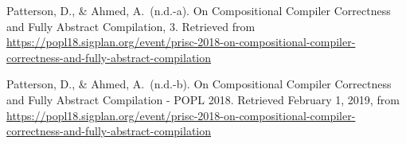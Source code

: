 \documentclass[12pt,twoside]{article}
\begin{document}
{\begin{thebibliography}{222}
Patterson, D., \& Ahmed, A.~(n.d.-a). On Compositional Compiler Correctness and Fully Abstract Compilation, 3. Retrieved from \href{https://popl18.sigplan.org/event/prisc-2018-on-compositional-compiler-correctness-and-fully-abstract-compilation}{{\ttfamily https://\hspace{0pt}popl18.\hspace{0pt}sigplan.\hspace{0pt}org/\hspace{0pt}event/\hspace{0pt}prisc-\hspace{0pt}2018-\hspace{0pt}on-\hspace{0pt}compositional-\hspace{0pt}compiler-\hspace{0pt}correctness-\hspace{0pt}and-\hspace{0pt}fully-\hspace{0pt}abstract-\hspace{0pt}compilation}}\label{patterson_compositional_nodate-1}%

Patterson, D., \& Ahmed, A.~(n.d.-b). On Compositional Compiler Correctness and Fully Abstract Compilation - POPL 2018. Retrieved February 1, 2019, from \href{https://popl18.sigplan.org/event/prisc-2018-on-compositional-compiler-correctness-and-fully-abstract-compilation}{{\ttfamily https://\hspace{0pt}popl18.\hspace{0pt}sigplan.\hspace{0pt}org/\hspace{0pt}event/\hspace{0pt}prisc-\hspace{0pt}2018-\hspace{0pt}on-\hspace{0pt}compositional-\hspace{0pt}compiler-\hspace{0pt}correctness-\hspace{0pt}and-\hspace{0pt}fully-\hspace{0pt}abstract-\hspace{0pt}compilation}}\label{patterson_compositional_nodate}%


\end{thebibliography}}
\end{document}
